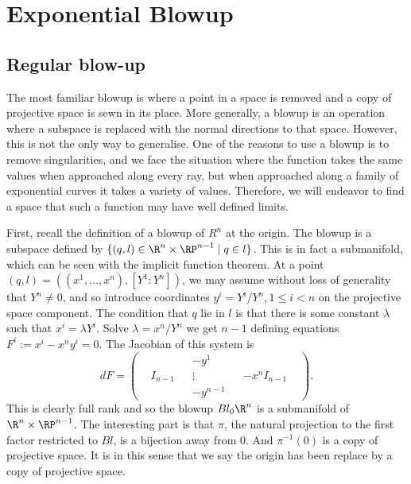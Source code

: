 \chapter{Exponential Blowup}
\label{chp:Exponential Blowup}

\section{Regular blow-up}
\label{sec:Regular blow-up}

The most familiar blowup is where a point in a space is removed and a copy of projective space is sewn in its place. More generally, a blowup is an operation where a subspace is replaced with the normal directions to that space. However, this is not the only way to generalise. One of the reasons to use a blowup is to remove singularities, and we face the situation where the function takes the same values when approached along every ray, but when approached along a family of exponential curves it takes a variety of values. Therefore, we will endeavor to find a space that such a function may have well defined limits.

First, recall the definition of a blowup of $R^n$ at the origin. The blowup is a subspace defined by $\{ (q, l) \in \R^n \times \RP^{n-1} \mid q \in l \}$. This is in fact a submanifold, which can be seen with the implicit function theorem. At a point $(q,l) = ((x^1,\dots,x^n),[Y^1:Y^n])$, we may assume without loss of generality that $Y^n \neq 0$, and so introduce coordinates $y^i = Y^i / Y^n, 1\leq i < n$ on the projective space component. The condition that $q$ lie in $l$ is that there is some constant $λ$ such that $x^i = λ Y^i$. Solve $λ = x^n / Y^n$ we get $n-1$ defining equations $F^i := x^i - x^n y^i = 0$. The Jacobian of this system is
\[
dF =
\left(\begin{array}{ccc|c|ccc}
    &           &   & -y^1      &   &               & \\
    & I_{n-1}   &   & \vdots    &   & -x^n I_{n-1}  & \\
    &           &   & -y^{n-1}  &   &               &
\end{array}\right).
\]
This is clearly full rank and so the blowup $Bl_0 \R^n$ is a submanifold of $\R^n \times \RP^{n-1}$. The interesting part is that $π$, the natural projection to the first factor restricted to $Bl$, is a bijection away from $0$. And $π^{-1}(0)$ is a copy of projective space. It is in this sense that we say the origin has been replace by a copy of projective space.

